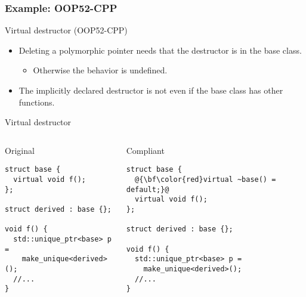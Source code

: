 \subsubsection{Example: OOP52-CPP}

\begin{frame}[t]{Virtual destructor (OOP52-CPP)}
\begin{itemize}
  \item Deleting a polymorphic pointer needs that the destructor is
         in the base class.
    \begin{itemize}
      \item Otherwise the behavior is undefined.
    \end{itemize}

  \vfill
  \item The implicitly declared destructor is not  even
        if the base class has other  functions.
\end{itemize}
\end{frame}

\begin{frame}[t,fragile]{Virtual destructor}
\begin{columns}

\begin{block}{Original}
\begin{lstlisting}
struct base {
  virtual void f();
};

struct derived : base {};

void f() {
  std::unique_ptr<base> p = 
    make_unique<derived>();
  //...
}
\end{lstlisting}
\end{block}

\pause
{}
\begin{block}{Compliant}
\begin{lstlisting}[escapechar=@]
struct base {
  @{\bf\color{red}virtual ~base() = default;}@
  virtual void f();
};

struct derived : base {};

void f() {
  std::unique_ptr<base> p = 
    make_unique<derived>();
  //...
}
\end{lstlisting}
\end{block}

\end{columns}
\end{frame}

